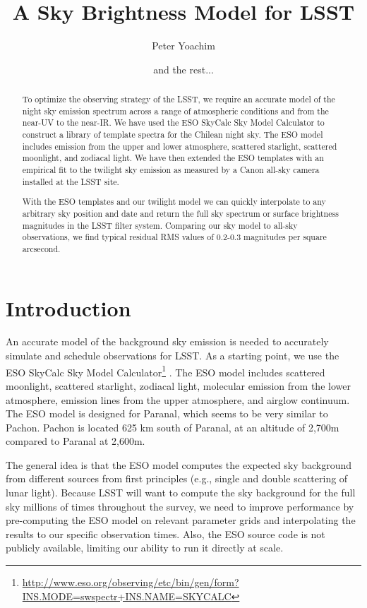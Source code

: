 \documentclass[]{spie}
\title{A Sky Brightness Model for LSST}
\author[a]{Peter Yoachim}
\author[b]{and the rest...}
\affil[a]{University of Washington}
\begin{document}
\maketitle

\begin{abstract}
  To optimize the observing strategy of the LSST, we require an accurate model of the night sky emission spectrum across a range of atmospheric conditions and from the near-UV to the near-IR.  We have used the ESO SkyCalc Sky Model Calculator \cite{Noll12,Jones13} to construct a library of template spectra for the Chilean night sky.  The ESO model includes emission from the upper and lower atmosphere, scattered starlight, scattered moonlight, and zodiacal light.
  We have then extended the ESO templates with an empirical fit to the twilight sky emission as measured by a Canon all-sky camera installed at the LSST site.

  With the ESO templates and our twilight model we can quickly interpolate to any arbitrary sky position and date and return the full sky spectrum or surface brightness magnitudes in the LSST filter system. Comparing our sky model to all-sky observations, we find typical residual RMS values of 0.2-0.3 magnitudes per square arcsecond.
\end{abstract}


\section{Introduction}

An accurate model of the background sky emission is needed to accurately simulate and schedule observations for LSST.  As a starting point, we use the ESO SkyCalc Sky Model Calculator\footnote{\url{http://www.eso.org/observing/etc/bin/gen/form?} \url{INS.MODE=swspectr+INS.NAME=SKYCALC}} \cite{Noll12,Jones13}.  The ESO model includes scattered moonlight, scattered starlight, zodiacal light, molecular emission from the lower atmosphere, emission lines from the upper atmosphere, and airglow continuum.  The ESO model is designed for Paranal, which seems to be very similar to Pachon.  Pachon is located 625 km south of Paranal, at an altitude of 2,700m compared to Paranal at 2,600m.  

The general idea is that the ESO model computes the expected sky background from different sources from first principles (e.g., single and double scattering of lunar light). Because LSST will want to compute the sky background for the full sky millions of times throughout the survey, we need to improve performance by pre-computing the ESO model on relevant parameter grids and interpolating the results to our specific observation times. Also, the ESO source code is not publicly available, limiting our ability to run it directly at scale.
\end{document}
